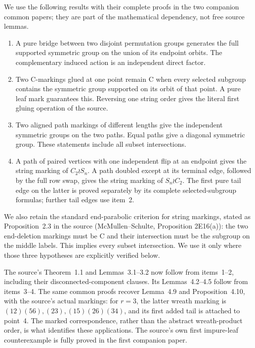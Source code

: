 \documentclass[a4paper,11pt]{article}
\begin{document}
We use the following results with their complete proofs in the two companion
common papers; they are part of the mathematical dependency, not free source
lemmas.
\begin{enumerate}
\item A pure bridge between two disjoint permutation groups generates the
full supported symmetric group on the union of its endpoint orbits. The
complementary induced action is an independent direct factor.
\item Two C-markings glued at one point remain C when every selected subgroup
contains the symmetric group supported on its orbit of that point. A pure
leaf mark guarantees this. Reversing one string order gives the literal
first gluing operation of the source.
\item Two aligned path markings of different lengths give the independent
symmetric groups on the two paths. Equal paths give a diagonal symmetric
group. These statements include all subset intersections.
\item A path of paired vertices with one independent flip at an endpoint gives
the string marking of $C_2\wr S_n$. A path doubled except at its terminal
edge, followed by the full row swap, gives the string marking of
$S_n\wr C_2$. The first pure tail edge on the latter is proved separately
by its complete selected-subgroup formulas; further tail edges use item~2.
\end{enumerate}
We also retain the standard end-parabolic criterion for string markings,
stated as Proposition~2.3 in the source (McMullen--Schulte, Proposition
2E16(a)): the two end-deletion markings must be C and their intersection
must be the subgroup on the middle labels. This implies every subset
intersection. We use it only where those three hypotheses are explicitly
verified below.

The source's Theorem~1.1 and Lemmas~3.1--3.2 now follow from items~1--2,
including their disconnected-component clauses. Its Lemmas~4.2--4.5 follow
from items~3--4. The same common proofs recover Lemma~4.9 and Proposition~4.10,
with the source's actual markings: for $r=3$, the latter wreath marking is
$(12)(56),(23),(15)(26)(34)$, and its first added tail is attached to point~4.
The marked correspondence, rather than the abstract wreath-product order,
is what identifies these applications. The source's own first impure-leaf
counterexample is fully proved in the first companion paper.
\end{document}
